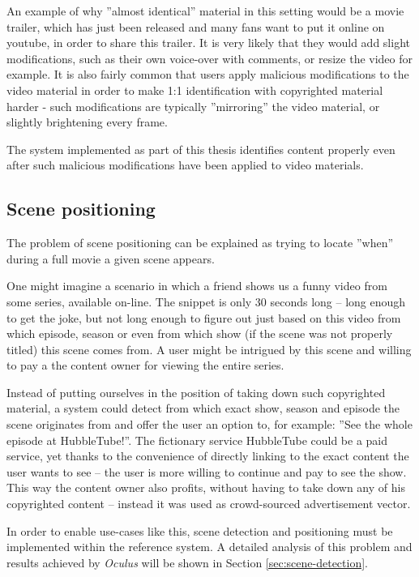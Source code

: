 An example of why ''almost identical'' material in this setting would be a movie trailer, which has just been released and many fans want to put it online on youtube, in order to share this trailer. It is very likely that they would add slight modifications, such as their own voice-over with comments, or resize the video for example. It is also fairly common that users apply malicious modifications to the video material in order to make 1:1 identification with copyrighted material harder - such modifications are typically ''mirroring'' the video material, or slightly brightening every frame. 

The system implemented as part of this thesis identifies content properly even after such malicious modifications have been applied to video materials.


\subsection{Scene positioning}
\label{sec:goal-sub-movie}
The problem of scene positioning can be explained as trying to locate ''when'' during a full movie a given scene appears.

One might imagine a scenario in which a friend shows us a funny video from some series, available on-line. The snippet is only 30 seconds long -- long enough to get the joke, but not long enough to figure out just based on this video from which episode, season or even from which show (if the scene was not properly titled) this scene comes from. A user might be intrigued by this scene and willing to pay a the content owner for viewing the entire series. 

Instead of putting ourselves in the position of taking down such copyrighted material, a system could detect from which exact show, season and episode the scene originates from and offer the user an option to, for example: ''See the whole episode at HubbleTube!''. The fictionary service HubbleTube could be a paid service, yet thanks to the convenience of directly linking to the exact content the user wants to see -- the user is more willing to continue and pay to see the show. This way the content owner also profits, without having to take down any of his copyrighted content -- instead it was used as crowd-sourced advertisement vector.

In order to enable use-cases like this, scene detection and positioning must be implemented within the reference system. A detailed analysis of this problem and results achieved by \textit{Oculus} will be shown in Section \ref{sec:scene-detection}.



